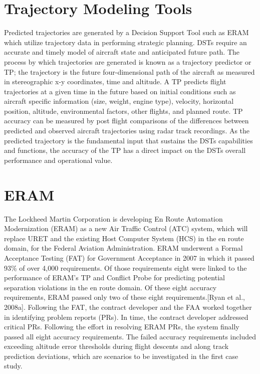 \documentclass[]{article}
\begin{document}
\section{Trajectory Modeling Tools}
\label{trajModelingTools}

Predicted trajectories are generated by a Decision Support Tool such as ERAM which utilize trajectory data in performing strategic planning. DSTs require an accurate and timely model of aircraft state and anticipated future path. The process by which trajectories are generated is known as a trajectory predictor or TP; the trajectory is the future four-dimensional path of the aircraft as measured in stereographic x-y coordinates, time and altitude. A TP predicts flight trajectories at a given time in the future based on initial conditions such as aircraft specific information (size, weight, engine type), velocity, horizontal position, altitude, environmental factors, other flights, and planned route. TP accuracy can be measured by post flight comparisons of the differences between predicted and observed aircraft trajectories using radar track recordings. As the predicted trajectory is the fundamental input that sustains the DSTs capabilities and functions, the accuracy of the TP has a direct impact on the DSTs overall performance and operational value.

\section{ERAM}
\label{ERAM}

The Lockheed Martin Corporation is developing En Route Automation Modernization (ERAM) as a new Air Traffic Control (ATC) system, which will replace URET and the existing Host Computer System (HCS) in the en route domain, for the Federal Aviation Administration. ERAM underwent a Formal Acceptance Testing (FAT) for Government Acceptance in 2007 in which it passed 93\% of over 4,000 requirements. Of those requirements eight were linked to the performance of ERAM’s TP and Conflict Probe for predicting potential separation violations in the en route domain. Of these eight accuracy requirements, ERAM passed only two of these eight requirements.[Ryan et al., 2008a]. Following the FAT, the contract developer and the FAA worked together in identifying problem reports (PRs). In time, the contract developer addressed critical PRs. Following the effort in resolving ERAM PRs, the system finally passed all eight accuracy requirements. The failed accuracy requirements included exceeding altitude error thresholds during flight descents and along track prediction deviations, which are scenarios to be investigated in the first case study. 
\end{document}
